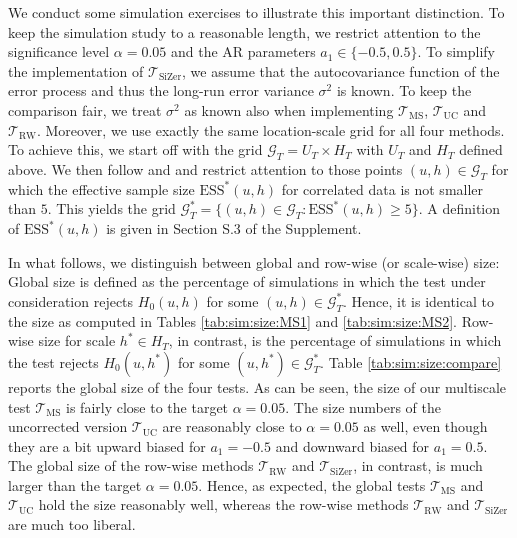 

We conduct some simulation exercises to illustrate this important distinction. To keep the simulation study to a reasonable length, we restrict attention to the significance level $\alpha=0.05$ and the AR parameters $a_1 \in \{-0.5,0.5\}$. To simplify the implementation of $\mathcal{T}_{\text{SiZer}}$, we assume that the autocovariance function of the error process and thus the long-run error variance $\sigma^2$ is known. To keep the comparison fair, we treat $\sigma^2$ as known also when implementing $\mathcal{T}_{\text{MS}}$, $\mathcal{T}_{\text{UC}}$ and $\mathcal{T}_{\text{RW}}$. Moreover, we use exactly the same location-scale grid for all four methods. To achieve this, we start off with the grid $\mathcal{G}_T = U_T \times H_T$ with $U_T$ and $H_T$ defined above. We then follow \cite{Rondonotti2007} and \cite{ParkHannigKang2009} and restrict attention to those points $(u,h) \in \mathcal{G}_T$ for which the effective sample size $\text{ESS}^*(u,h)$ for correlated data is not smaller than $5$. This yields the grid $\mathcal{G}_T^* = \{ (u, h) \in \mathcal{G}_T : \text{ESS}^*(u, h) \geq 5 \}$. A definition of $\text{ESS}^*(u,h)$ is given in Section S.3 of the Supplement. 


In what follows, we distinguish between global and row-wise (or scale-wise) size: Global size is defined as the percentage of simulations in which the test under consideration rejects $H_0(u,h)$ for some $(u,h) \in \mathcal{G}_T^*$. Hence, it is identical to the size as computed in Tables \ref{tab:sim:size:MS1} and \ref{tab:sim:size:MS2}. Row-wise size for scale $h^* \in H_T$, in contrast, is the percentage of simulations in which the test rejects $H_0(u,h^*)$ for some $(u,h^*) \in \mathcal{G}_T^*$. %
Table \ref{tab:sim:size:compare} reports the global size of the four tests. As can be seen, the size of our multiscale test $\mathcal{T}_{\text{MS}}$ is fairly close to the target $\alpha=0.05$. The size numbers of the uncorrected version $\mathcal{T}_{\text{UC}}$ are reasonably close to $\alpha=0.05$ as well, even though they are a bit upward biased for $a_1=-0.5$ and downward biased for $a_1=0.5$. The global size of the row-wise methods $\mathcal{T}_{\text{RW}}$ and $\mathcal{T}_{\text{SiZer}}$, in contrast, is much larger than the target $\alpha=0.05$. Hence, as expected, the global tests $\mathcal{T}_{\text{MS}}$ and $\mathcal{T}_{\text{UC}}$ hold the size reasonably well, whereas the row-wise methods $\mathcal{T}_{\text{RW}}$ and $\mathcal{T}_{\text{SiZer}}$ are much too liberal. 


